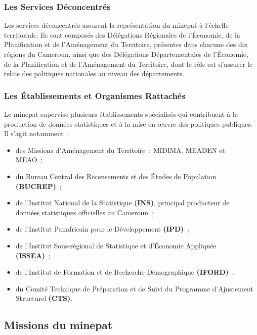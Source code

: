 \documentclass[12pt, a4paper, oneside]{report}
\begin{document}
\subsubsection{Les Services Déconcentrés}

Les services déconcentrés assurent la représentation du \gls{minepat} à l'échelle
territoriale. Ils sont composés des Délégations Régionales de l'Économie, de la
Planification et de l'Aménagement du Territoire, présentes dans chacune des dix
régions du Cameroun, ainsi que des Délégations Départementales de l'Économie, de
la Planification et de l'Aménagement du Territoire, dont le rôle est d'assurer le
relais des politiques nationales au niveau des départements.

\subsubsection{Les Établissements et Organismes Rattachés}

Le \gls{minepat} supervise plusieurs établissements spécialisés qui contribuent à la
production de données statistiques et à la mise en \oe uvre des politiques publiques.
Il s'agit notamment~:

\begin{itemize}
	\item des Missions d'Aménagement du Territoire~: MIDIMA, MEADEN et MEAO~;
	\item du Bureau Central des Recensements et des Études de Population
	\textbf{(BUCREP)}~;
	\item de l'Institut National de la Statistique \textbf{(INS)}, principal producteur
	de données statistiques officielles au Cameroun~;
	\item de l'Institut Panafricain pour le Développement \textbf{(IPD)}~;
	\item de l'Institut Sous-régional de Statistique et d'Économie Appliquée
	\textbf{(ISSEA)}~;
	\item de l'Institut de Formation et de Recherche Démographique \textbf{(IFORD)}~;
	\item du Comité Technique de Préparation et de Suivi du Programme d'Ajustement
	Structurel \textbf{(CTS)}.
\end{itemize}

\subsection[Missions du MINEPAT]{Missions du \gls{minepat}}
\end{document}
